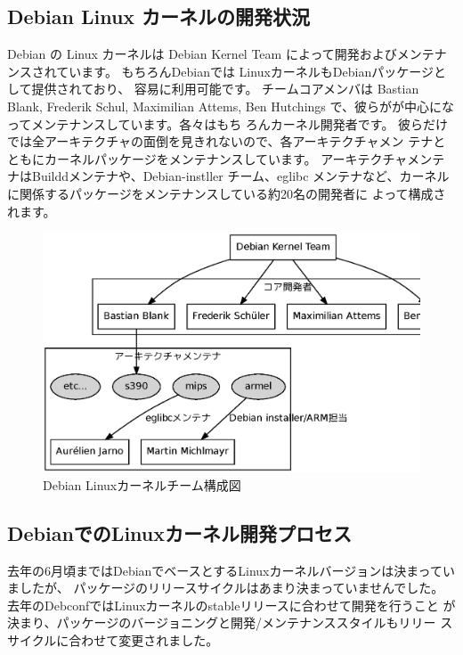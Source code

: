 \documentclass[mingoth,a4paper]{jsarticle}
\begin{document}
\subsection{Debian Linux カーネルの開発状況}
Debian の Linux カーネルは Debian Kernel Team によって開発およびメンテナ
ンスされています。
もちろんDebianでは LinuxカーネルもDebianパッケージとして提供されており、
容易に利用可能です。
チームコアメンバは Bastian Blank, Frederik Schul, Maximilian Attems,
Ben Hutchings で、彼らがが中心になってメンテナンスしています。各々はもち
ろんカーネル開発者です。
彼らだけでは全アーキテクチャの面倒を見きれないので、各アーキテクチャメン
テナとともにカーネルパッケージをメンテナンスしています。
アーキテクチャメンテナはBuilddメンテナや、Debian-instller チーム、eglibc
メンテナなど、カーネルに関係するパッケージをメンテナンスしている約20名の開発者に
よって構成されます。

\begin{figure}[H]
\begin{center}
\includegraphics[width=1.0\hsize]{image201005/debian-kernel-team.eps}
\caption{Debian Linuxカーネルチーム構成図}
\label{fig:debian-kernel-team}
\end{center}
\end{figure}

\subsection{DebianでのLinuxカーネル開発プロセス}
去年の6月頃まではDebianでベースとするLinuxカーネルバージョンは決まっていましたが、
パッケージのリリースサイクルはあまり決まっていませんでした。
去年のDebconfではLinuxカーネルのstableリリースに合わせて開発を行うこと
が決まり、パッケージのバージョニングと開発/メンテナンススタイルもリリー
スサイクルに合わせて変更されました。
\end{document}
